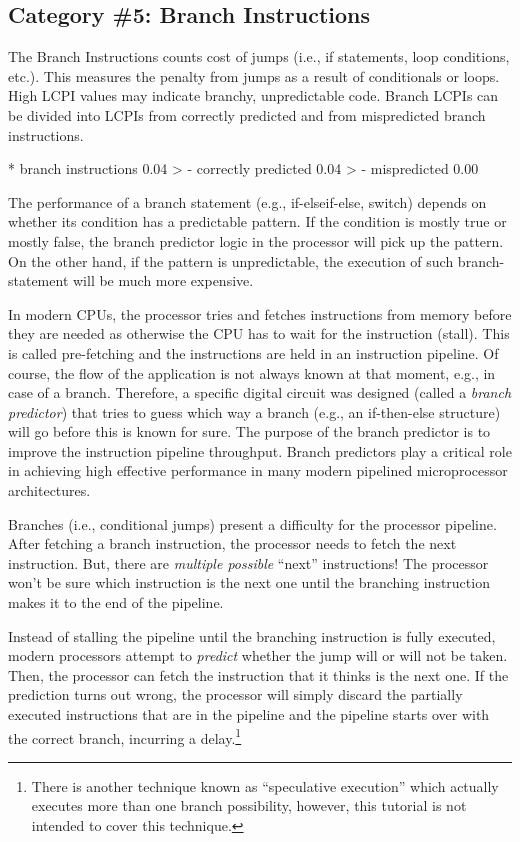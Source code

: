 \subsection{Category \#5: Branch Instructions}
\label{subsec:CAT5_Branch_Instructions}

The Branch Instructions counts cost of jumps (i.e., if statements, loop conditions, etc.). This measures the penalty from jumps as a result of conditionals or loops. High LCPI values may indicate branchy, unpredictable code. Branch LCPIs can be divided into LCPIs from correctly predicted and from mispredicted branch instructions.

\begin{prompt}
* branch instructions   0.04 >
 - correctly predicted  0.04 >
 - mispredicted         0.00
\end{prompt}

The performance of a branch statement (e.g., if-elseif-else, switch) depends on whether its condition has a predictable pattern. If the condition is mostly true or mostly false, the branch predictor logic in the processor will pick up the pattern. On the other hand, if the pattern is unpredictable, the execution of such branch-statement will be much more expensive.

In modern CPUs, the processor tries and fetches instructions from memory before they are needed as otherwise the CPU has to wait for the instruction (stall). This is called pre-fetching and the instructions are held in an instruction pipeline. Of course, the flow of the application is not always known at that moment, e.g., in case of a branch. Therefore, a specific digital circuit was designed (called a \emph{branch predictor}) that tries to guess which way a branch (e.g., an if-then-else structure) will go before this is known for sure. The purpose of the branch predictor is to improve the instruction pipeline throughput. Branch predictors play a critical role in achieving high effective performance in many modern pipelined microprocessor architectures.

Branches (i.e., conditional jumps) present a difficulty for the processor pipeline. After fetching a branch instruction, the processor needs to fetch the next instruction. But, there are \emph{multiple possible} ``next'' instructions! The processor won't be sure which instruction is the next one until the branching instruction makes it to the end of the pipeline.

Instead of stalling the pipeline until the branching instruction is fully executed, modern processors attempt to \emph{predict} whether the jump will or will not be taken. Then, the processor can fetch the instruction that it thinks is the next one. If the prediction turns out wrong, the processor will simply discard the partially executed instructions that are in the pipeline and the pipeline starts over with the correct branch, 
incurring a delay.\footnote{There is another technique known as ``speculative execution'' which actually executes more than one branch possibility, however, this tutorial is not intended to cover this technique.}

